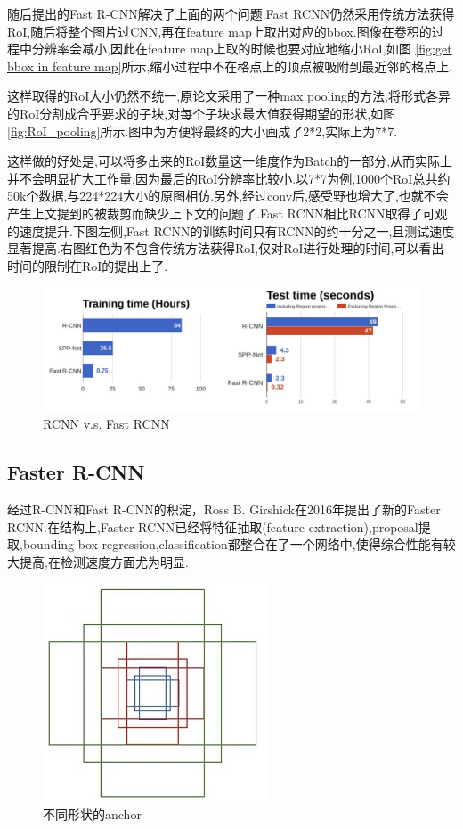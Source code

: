 随后提出的Fast R-CNN解决了上面的两个问题.Fast RCNN仍然采用传统方法获得RoI,随后将整个图片过CNN,再在feature map上取出对应的bbox.图像在卷积的过程中分辨率会减小,因此在feature map上取的时候也要对应地缩小RoI,如图 \ref{fig:get bbox in feature map}所示,缩小过程中不在格点上的顶点被吸附到最近邻的格点上.

这样取得的RoI大小仍然不统一,原论文采用了一种max pooling的方法,将形式各异的RoI分割成合乎要求的子块,对每个子块求最大值获得期望的形状,如图 \ref{fig:RoI_pooling}所示.图中为方便将最终的大小画成了2*2,实际上为7*7.

这样做的好处是,可以将多出来的RoI数量这一维度作为Batch的一部分,从而实际上并不会明显扩大工作量,因为最后的RoI分辨率比较小.以7*7为例,1000个RoI总共约50k个数据,与224*224大小的原图相仿.另外,经过conv后,感受野也增大了,也就不会产生上文提到的被裁剪而缺少上下文的问题了.Fast RCNN相比RCNN取得了可观的速度提升.下图左侧,Fast RCNN的训练时间只有RCNN的约十分之一,且测试速度显著提高.右图红色为不包含传统方法获得RoI,仅对RoI进行处理的时间,可以看出时间的限制在RoI的提出上了.

\begin{figure}[htbp]
    \centering
    \includegraphics[scale=0.65]{figures/rcnn_vs_frcnn.png}
    \caption{RCNN v.s. Fast RCNN}
    \label{}
\end{figure}

\subsection{Faster R-CNN}

经过R-CNN和Fast R-CNN的积淀，Ross B. Girshick在2016年提出了新的Faster RCNN.在结构上,Faster RCNN已经将特征抽取(feature extraction),proposal提取,bounding box regression,classification都整合在了一个网络中,使得综合性能有较大提高,在检测速度方面尤为明显.

\begin{figure}
    \includegraphics[scale=0.5]{figures/anchor.jpg}
    \caption{不同形状的anchor}
    \label{fig:anchor}
\end{figure}

